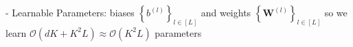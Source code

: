- Learnable Parameters: biases $\left\{b^{(l)}\right\}_{l \in[L]}$ and weights $\left\{\mathbf{W}^{(l)}\right\}_{l \in[L]}$ so we learn $\mathcal{O}\left(d K+K^{2} L\right) \approx \mathcal{O}\left(K^{2} L\right)$ parameters














